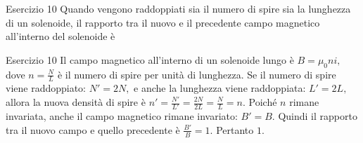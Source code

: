 \documentclass[a4paper]{article}
\begin{document}
\begin{snippetexercise}{Esercizio 10}
    Quando vengono raddoppiati sia il numero di spire sia la lunghezza di un
    solenoide, il rapporto tra il nuovo e il precedente campo magnetico
    all'interno del solenoide è

\end{snippetexercise}
\begin{snippetsolution}{Esercizio 10}
    Il campo magnetico all'interno di un solenoide lungo è
    \(B = \mu_0 n i,\)
    dove
    \(n = \frac{N}{L}\)
    è il numero di spire per unità di lunghezza.
    Se il numero di spire viene raddoppiato:
    \(N' = 2N,\)
    e anche la lunghezza viene raddoppiata:
    \(L' = 2L,\)
    allora la nuova densità di spire è
    \(n' = \frac{N'}{L'} = \frac{2N}{2L} = \frac{N}{L} = n.\)
    Poiché \(n\) rimane invariata, anche il campo magnetico rimane invariato:
    \(B' = B.\)
    Quindi il rapporto tra il nuovo campo e quello precedente è
    \(\frac{B'}{B} = 1.\)
    Pertanto
    \(\boxed{1}.\)
\end{snippetsolution}
\pagebreak
\end{document}
